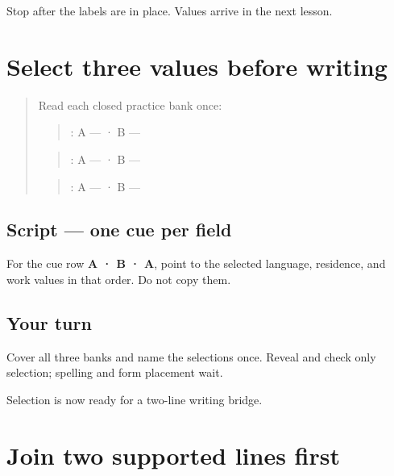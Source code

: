\begin{tcolorbox}[breakable,colback=teal!4,colframe=teal!35!black,title={Before you move on}]
Stop after the labels are in place. Values arrive in the next lesson.
\end{tcolorbox}
\section[A · B · A (three remembered bank cues)]{Select three values before writing}

\label{lesson:PA-W06-three-field-cues}



\begin{quote}
Read each closed practice bank once:

\begin{quote}
: A — \textbf{} · B — \textbf{}
\end{quote}

\begin{quote}
: A — \textbf{} · B — \textbf{}
\end{quote}

\begin{quote}
: A — \textbf{} · B — \textbf{}
\end{quote}
\end{quote}

\subsection*{Script — one cue per field}
For the cue row \textbf{A · B · A}, point to the selected language, residence, and work values in that order. Do not copy them.

\subsection*{Your turn}
Cover all three banks and name the selections once. Reveal and check only selection; spelling and form placement wait.

\begin{tcolorbox}[breakable,colback=teal!4,colframe=teal!35!black,title={Before you move on}]
Selection is now ready for a two-line writing bridge.
\end{tcolorbox}
\section[\texorpdfstring{\pa{ਭਾਸ਼ਾ}: \pa{ਪੰਜਾਬੀ} … (two supported …)}{ਭਾਸ਼ਾ: ਪੰਜਾਬੀ … (two supported …)}]{Join two supported lines first}

